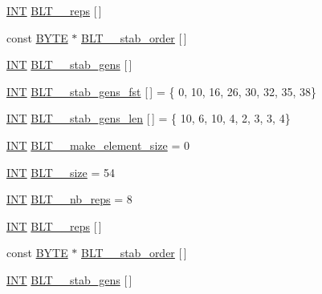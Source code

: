\begin{DoxyCompactItemize}
\item 
\mbox{\hyperlink{galois_8h_a09fddde158a3a20bd2dcadb609de11dc}{I\+NT}} \mbox{\hyperlink{data___b_l_t_8_c_ade9e9ae024072927a0594b814c470e63}{B\+L\+T\+\_\+\_\+reps}} \mbox{[}$\,$\mbox{]}
\item 
const \mbox{\hyperlink{galois_8h_ab6cc7b4aeb6ea31aba2b3fbfc83ff5e6}{B\+Y\+TE}} $\ast$ \mbox{\hyperlink{data___b_l_t_8_c_a96c84f25960409b8d61a1f90338d3c4b}{B\+L\+T\+\_\+\_\+stab\+\_\+order}} \mbox{[}$\,$\mbox{]}
\item 
\mbox{\hyperlink{galois_8h_a09fddde158a3a20bd2dcadb609de11dc}{I\+NT}} \mbox{\hyperlink{data___b_l_t_8_c_af901def233a2fe15caec936d5ddb05d4}{B\+L\+T\+\_\+\_\+stab\+\_\+gens}} \mbox{[}$\,$\mbox{]}
\item 
\mbox{\hyperlink{galois_8h_a09fddde158a3a20bd2dcadb609de11dc}{I\+NT}} \mbox{\hyperlink{data___b_l_t_8_c_a7fe7596006150337d0e9024e525ba131}{B\+L\+T\+\_\+\_\+stab\+\_\+gens\+\_\+fst}} \mbox{[}$\,$\mbox{]} = \{ 0, 10, 16, 26, 30, 32, 35, 38\}
\item 
\mbox{\hyperlink{galois_8h_a09fddde158a3a20bd2dcadb609de11dc}{I\+NT}} \mbox{\hyperlink{data___b_l_t_8_c_a4ec2b1617e66578395e70afb1be95e7f}{B\+L\+T\+\_\+\_\+stab\+\_\+gens\+\_\+len}} \mbox{[}$\,$\mbox{]} = \{ 10, 6, 10, 4, 2, 3, 3, 4\}
\item 
\mbox{\hyperlink{galois_8h_a09fddde158a3a20bd2dcadb609de11dc}{I\+NT}} \mbox{\hyperlink{data___b_l_t_8_c_a0052b5f550337059f61fc0f9d9fbb9f1}{B\+L\+T\+\_\+\_\+make\+\_\+element\+\_\+size}} = 0
\item 
\mbox{\hyperlink{galois_8h_a09fddde158a3a20bd2dcadb609de11dc}{I\+NT}} \mbox{\hyperlink{data___b_l_t_8_c_a8283823d8dd66c87e56e2798617688b2}{B\+L\+T\+\_\+\_\+size}} = 54
\item 
\mbox{\hyperlink{galois_8h_a09fddde158a3a20bd2dcadb609de11dc}{I\+NT}} \mbox{\hyperlink{data___b_l_t_8_c_a971a3c87020483526a76b882f85921db}{B\+L\+T\+\_\+\_\+nb\+\_\+reps}} = 8
\item 
\mbox{\hyperlink{galois_8h_a09fddde158a3a20bd2dcadb609de11dc}{I\+NT}} \mbox{\hyperlink{data___b_l_t_8_c_aa533a183c11671baf11519a217f10e2c}{B\+L\+T\+\_\+\_\+reps}} \mbox{[}$\,$\mbox{]}
\item 
const \mbox{\hyperlink{galois_8h_ab6cc7b4aeb6ea31aba2b3fbfc83ff5e6}{B\+Y\+TE}} $\ast$ \mbox{\hyperlink{data___b_l_t_8_c_a959fb582c5e6d1f52782368748eced8e}{B\+L\+T\+\_\+\_\+stab\+\_\+order}} \mbox{[}$\,$\mbox{]}
\item 
\mbox{\hyperlink{galois_8h_a09fddde158a3a20bd2dcadb609de11dc}{I\+NT}} \mbox{\hyperlink{data___b_l_t_8_c_a88fc8988b2f395b51113287bcde118c5}{B\+L\+T\+\_\+\_\+stab\+\_\+gens}} \mbox{[}$\,$\mbox{]}

\end{DoxyCompactItemize}
